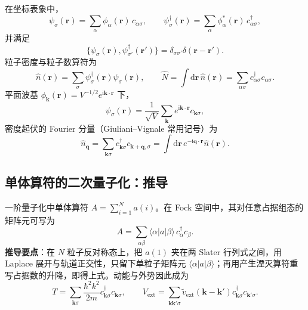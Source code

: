 在坐标表象中，
\begin{equation}
  \psi_\sigma(\mathbf{r})
  =\sum_\alpha \phi_\alpha(\mathbf{r})\,c_{\alpha\sigma},
  \qquad
  \psi_\sigma^\dagger(\mathbf{r})
  =\sum_\alpha \phi_\alpha^*(\mathbf{r})\,c_{\alpha\sigma}^\dagger,
\end{equation}
并满足
\begin{equation}
  \{\psi_\sigma(\mathbf{r}),\psi_{\sigma'}^\dagger(\mathbf{r}')\}
  =\delta_{\sigma\sigma'}\delta(\mathbf{r}-\mathbf{r}').
\end{equation}
粒子密度与粒子数算符为
\begin{equation}
  \hat n(\mathbf{r})=\sum_\sigma\psi_\sigma^\dagger(\mathbf{r})\psi_\sigma(\mathbf{r}),
  \qquad
  \hat N=\int\mathrm{d}\mathbf{r}\,\hat n(\mathbf{r})
  =\sum_{\alpha\sigma}c_{\alpha\sigma}^\dagger c_{\alpha\sigma}.
\end{equation}
平面波基 $\phi_{\mathbf{k}}(\mathbf{r})=V^{-1/2}e^{\mathrm{i}\mathbf{k}\cdot\mathbf{r}}$ 下，
\begin{equation}
  \psi_\sigma(\mathbf{r})
  =\frac{1}{\sqrt{V}}\sum_{\mathbf{k}}
  e^{\mathrm{i}\mathbf{k}\cdot\mathbf{r}}c_{\mathbf{k}\sigma},
\end{equation}
密度起伏的 Fourier 分量（Giuliani--Vignale 常用记号）为
\begin{equation}
  \hat n_{\mathbf{q}}
  =\sum_{\mathbf{k}\sigma}
  c_{\mathbf{k}\sigma}^\dagger c_{\mathbf{k}+\mathbf{q},\sigma}
  =\int\mathrm{d}\mathbf{r}\,e^{-\mathrm{i}\mathbf{q}\cdot\mathbf{r}}\hat n(\mathbf{r}).
\end{equation}

\subsection{单体算符的二次量子化：推导}

一阶量子化中单体算符 $A=\sum_{i=1}^N a(i)$。在 Fock 空间中，其对任意占据组态的矩阵元可写为
\begin{equation}
  A=\sum_{\alpha\beta}
  \langle\alpha|a|\beta\rangle\,c_\alpha^\dagger c_\beta.
\end{equation}
\textbf{推导要点}：在 $N$ 粒子反对称态上，把 $a(1)$ 夹在两 Slater 行列式之间，用 Laplace 展开与轨道正交性，只留下单粒子矩阵元 $\langle\alpha|a|\beta\rangle$；再用产生湮灭算符重写占据数的升降，即得上式。动能与外势因此成为
\begin{equation}
  T=\sum_{\mathbf{k}\sigma}\frac{\hbar^2k^2}{2m}
  c_{\mathbf{k}\sigma}^\dagger c_{\mathbf{k}\sigma},
  \qquad
  V_{\mathrm{ext}}
  =\sum_{\mathbf{k}\mathbf{k}'\sigma}
  \tilde v_{\mathrm{ext}}(\mathbf{k}-\mathbf{k}')
  c_{\mathbf{k}\sigma}^\dagger c_{\mathbf{k}'\sigma}.
\end{equation}

